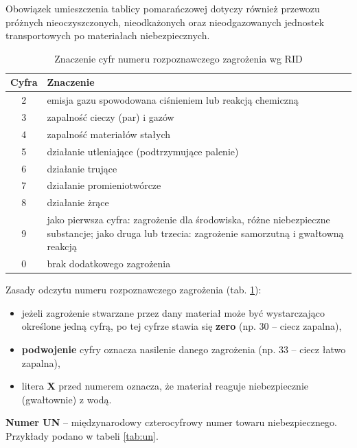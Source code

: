 Obowiązek umieszczenia tablicy pomarańczowej dotyczy również przewozu próżnych nieoczyszczonych, nieodkażonych oraz nieodgazowanych jednostek transportowych po materiałach niebezpiecznych.

\begin{table}
	\caption{Znaczenie cyfr numeru rozpoznawczego zagrożenia wg RID}
	\label{tab:hin}
	\begin{tabular}{|c|m{}|}
		\hline
		Cyfra & Znaczenie \\ \hline
		2 & emisja gazu spowodowana ciśnieniem lub reakcją chemiczną \\ \hline
		3 & zapalność cieczy (par) i gazów \\ \hline
		4 & zapalność materiałów stałych \\ \hline
		5 & działanie utleniające (podtrzymujące palenie) \\ \hline
		6 & działanie trujące \\ \hline
		7 & działanie promieniotwórcze \\ \hline
		8 & działanie żrące \\ \hline
		9 & jako pierwsza cyfra: zagrożenie dla środowiska, różne niebezpieczne substancje; jako druga lub trzecia: zagrożenie samorzutną i gwałtowną reakcją \\ \hline
		0 & brak dodatkowego zagrożenia \\ \hline
	\end{tabular}
\end{table}

Zasady odczytu numeru rozpoznawczego zagrożenia (tab. \ref{tab:hin}):
\begin{itemize}
	\item jeżeli zagrożenie stwarzane przez dany materiał może być wystarczająco określone jedną cyfrą, po tej cyfrze stawia się \textbf{zero} (np. 30 – ciecz zapalna),
	\item \textbf{podwojenie} cyfry oznacza nasilenie danego zagrożenia (np. 33 – ciecz łatwo zapalna),
	\item litera \textbf{X} przed numerem oznacza, że materiał reaguje niebezpiecznie (gwałtownie) z wodą.
\end{itemize}

\textbf{Numer UN} – międzynarodowy czterocyfrowy numer towaru niebezpiecznego. Przykłady podano w tabeli \ref{tab:un}.

